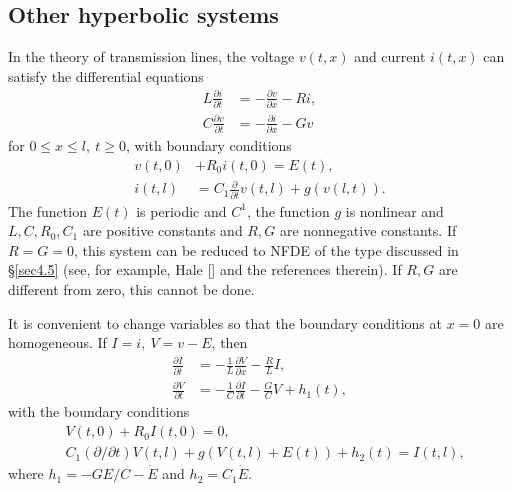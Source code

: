 \documentclass{surv-l}
\theoremstyle{plain}
\theoremstyle{definition}
\numberwithin{equation}{section}
\numberwithin{figure}{chapter}
\begin{document}
\subsection{Other hyperbolic systems}\label{subsec4.9.4} In the theory of transmission lines, the voltage $v(t, x)$ and current $i(t, x)$ can satisfy the differential equations
\begin{align*}
L\frac{\partial i}{\partial t} & =-\frac{\partial v}{\partial x}-Ri,\\
C\frac{\partial v}{\partial t} & =-\frac{\partial i}{\partial x}-Gv
\end{align*}
for $0\leq x\leq l,\ t\geq 0$, with boundary conditions
\begin{align*}
v(t, 0) & + R_{0}i(t, 0)=E(t),\\
i(t, l) & =C_{1}\frac{\partial}{\partial t}v(t, l)+g(v(l, t)).
\end{align*}
The function $E(t)$ is periodic and $C^{1}$, the function $g$ is nonlinear and $L, C, R_{0}, C_{1}$ are positive constants and $R, G$ are nonnegative constants. If $R=G=0$, this system can be reduced to NFDE of the type discussed in \S \ref{sec4.5} (see, for example, Hale [\citeyear{1977h}] and the references therein). If $R, G$ are different from zero, this
cannot be done.

It is convenient to change variables so that the boundary conditions at $x=0$ are homogeneous. If $I=i,\ V=v-E$, then
\begin{equation}\label{chap04:eq9.13}
\begin{split}
\frac{\partial I}{\partial t}& =-\frac{1}{L}\frac{\partial V}{\partial x}-\frac{R}{L}I,\\
\frac{\partial V}{\partial t}& =-\frac{1}{C}\frac{\partial I}{\partial t}-\frac{G}{C}V+h_{1}(t),
\end{split}
\end{equation}
with the boundary conditions
\begin{equation}
\begin{split}\label{chap04:eq9.14}
& V(t, 0)+R_{0}I(t, 0)=0,\\
& C_{1}(\partial/\partial t)V(t, l)+g(V(t, l)+E(t))+h_{2}(t)=I(t, l),
\end{split}
\end{equation}
where $h_{1}=-GE/C-\dot{E}$ and $h_{2}=C_{1}\dot{E}$.
\end{document}
